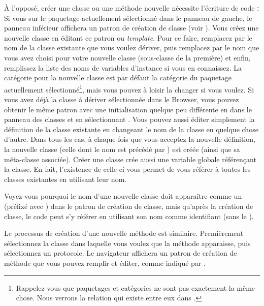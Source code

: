 \documentclass[a4paper,10pt,twoside]{book}
\begin{document}
À l'opposé, créer une classe ou une méthode nouvelle nécessite 
l'écriture de code \st.
Si vous \clickz sur le paquetage actuellement sélectionné dans le
panneau de gauche, le panneau inférieur affichera un patron de création de classe
(voir ).
Vous créez une nouvelle classe en éditant ce patron ou \emph{template}. 
Pour ce faire, remplacez  par le nom de la classe existante
que vous voulez dériver, puis remplacez  par le nom
que vous avez choisi pour votre nouvelle classe (sous-classe de la première) 
et enfin, remplissez la liste des noms de variables d'instance si vous en connaissez.  
La catégorie pour la nouvelle classe est par défaut la
catégorie du paquetage actuellement sélectionné\footnote{Rappelez-vous que paquetages et catégories ne sont pas exactement la même chose. 
Nous verrons la relation qui existe entre eux dans .}, 
mais vous pouvez à loisir la changer si vous voulez.
Si vous avez déjà la classe à dériver sélectionnée dans 
le Browser, vous pouvez obtenir le même patron avec une initialisation
quelque peu différente en \actclickant dans le panneau des classes et en sélectionnant 
.
Vous pouvez aussi éditer simplement la définition de la classe existante en changeant 
le nom de la classe en quelque chose d'autre.
Dans tous les cas, à chaque fois que vous acceptez la nouvelle définition, la nouvelle classe 
(celle dont le nom est précédé par \ct{#}) est créée (ainsi que sa méta-classe associée).  
Créer une classe crée aussi une variable globale référençant
la classe. En fait, l'existence de celle-ci vous permet de vous 
référer à toutes les classes existantes en utilisant leur nom.

Voyez-vous pourquoi le nom d'une nouvelle classe doit apparaître
comme un  (\ie préfixé avec \ct{#}) dans le
patron de création de classe, mais qu'après la création
de classe, le code peut s'y référer en utilisant
son nom comme identifiant (\ie sans le \ct{#}).

Le processus de création d'une nouvelle méthode
est similaire. Premièrement sélectionnez la classe dans laquelle vous
voulez que la méthode apparaisse, puis sélectionnez un protocole.
Le navigateur affichera un patron de création de méthode que
vous pouvez remplir et éditer, comme indiqué par
.
\end{document}
